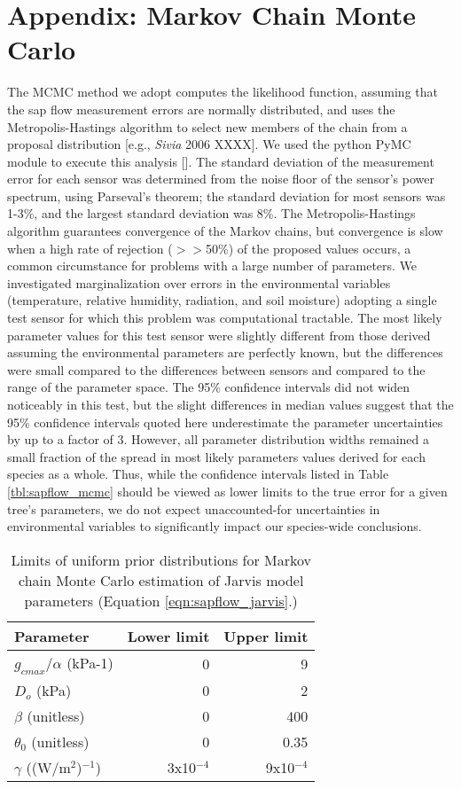 \section{Appendix: Markov Chain Monte Carlo}
\label{sec:sapflow_appendix}

The MCMC method we adopt computes the likelihood function, assuming that the sap flow measurement errors are normally distributed, and uses the Metropolis-Hastings algorithm to select new members of the chain from a proposal distribution [e.g., \textit{Sivia} 2006 XXXX]. We used the python PyMC module to execute this analysis [\cite{patil}]. The standard deviation of the measurement error for each sensor was determined from the noise floor of the sensor's power spectrum, using Parseval's theorem; the standard deviation for most sensors was 1-3\%, and the largest standard deviation was 8\%.  The Metropolis-Hastings algorithm guarantees convergence of the Markov chains, but convergence is slow when a high rate of rejection ($>>$50\%) of the proposed values occurs, a common circumstance for problems with a large number of parameters.  We investigated marginalization over errors in the environmental variables (temperature, relative humidity, radiation, and soil moisture) adopting a single test sensor for which this problem was computational tractable.  The most likely parameter values for this test sensor were slightly different from those derived assuming the environmental parameters are perfectly known, but the differences were small compared to the differences between sensors and compared to the range of the parameter space.  The 95\% confidence intervals did not widen noticeably in this test, but the slight differences in median values suggest that the 95\% confidence intervals quoted here underestimate the parameter uncertainties by up to a factor of 3.  However, all parameter distribution widths remained a small fraction of the spread in most likely parameters values derived for each species as a whole.  Thus, while the confidence intervals listed in Table \ref{tbl:sapflow_mcmc} should be viewed as lower limits to the true error for a given tree's parameters, we do not expect unaccounted-for uncertainties in environmental variables to significantly impact our species-wide conclusions.

\begin{table}
  \caption{Limits of uniform prior distributions for Markov chain Monte Carlo estimation of Jarvis model parameters (Equation \ref{eqn:sapflow_jarvis}.)}
  \label{tbl:sapflow_priors}
  \begin{tabular}{l r r}
  \hline
  Parameter & Lower limit & Upper limit \\
  \hline
  $g_{cmax}/\alpha$ (kPa-1) & 0 & 9 \\
  $D_o$ (kPa) & 0 & 2 \\
  $\beta$ (unitless) & 0 & 400 \\
  $\theta_0$ (unitless) & 0 & 0.35 \\
  $\gamma$ ((W/m$^2$)$^{-1}$) & 3x10$^{-4}$ & 9x10$^{-4}$ \\
  \hline
  \end{tabular}
\end{table}

